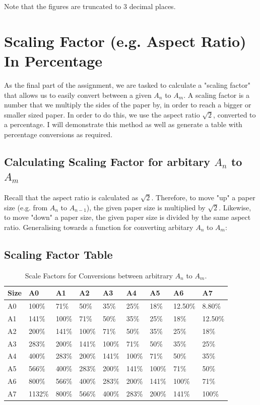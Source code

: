\noindent
Note that the figures are truncated to 3 decimal places.

\section*{Scaling Factor (e.g. Aspect Ratio) In Percentage}
As the final part of the assignment, we are tasked to calculate a "scaling factor" that allows us to easily convert between a given $A_n$ to $A_m$. A scaling factor is a number that we multiply the sides of the paper by, in order to reach a bigger or smaller sized paper. In order to do this, we use the aspect ratio $\sqrt{2}$, converted to a percentage. I will demonstrate this method as well as generate a table with percentage conversions as required.

\subsection*{Calculating Scaling Factor for arbitary $A_n$ to $A_m$}
Recall that the aspect ratio is calculated as $\sqrt{2}$. Therefore, to move "up" a paper size (e.g. from $A_n$ to $A_{n - 1}$), the given paper size is multiplied by $\sqrt{2}$. Likewise, to move "down" a paper size, the given paper size is divided by the same aspect ratio. Generalising towards a function for converting arbitary $A_n$ to $A_m$: 

\subsection*{Scaling Factor Table}
\begin{table}[h]
\centering\makegapedcells
\begin{tabular}{@{}lllllllll@{}}
\toprule
Size & A0     & A1    & A2    & A3    & A4    & A5    & A6      & A7      \\ \midrule
A0   & 100\%  & 71\%  & 50\%  & 35\%  & 25\%  & 18\%  & 12.50\% & 8.80\%  \\
A1   & 141\%  & 100\% & 71\%  & 50\%  & 35\%  & 25\%  & 18\%    & 12.50\% \\
A2   & 200\%  & 141\% & 100\% & 71\%  & 50\%  & 35\%  & 25\%    & 18\%    \\
A3   & 283\%  & 200\% & 141\% & 100\% & 71\%  & 50\%  & 35\%    & 25\%    \\
A4   & 400\%  & 283\% & 200\% & 141\% & 100\% & 71\%  & 50\%    & 35\%    \\
A5   & 566\%  & 400\% & 283\% & 200\% & 141\% & 100\% & 71\%    & 50\%    \\
A6   & 800\%  & 566\% & 400\% & 283\% & 200\% & 141\% & 100\%   & 71\%    \\
A7   & 1132\% & 800\% & 566\% & 400\% & 283\% & 200\% & 141\%   & 100\%   \\ \bottomrule
\end{tabular}
\caption{Scale Factors for Conversions between arbitrary $A_n$ to $A_m$. }
\label{tab:scale-factor}
\end{table}
